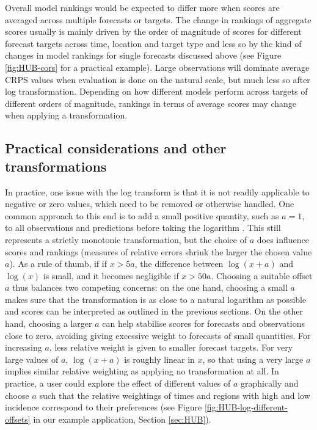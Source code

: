 \documentclass{article}
\begin{document}
Overall model rankings would be expected to differ more when scores are averaged across multiple forecasts or targets. The change in rankings of aggregate scores usually is mainly driven by the order of magnitude of scores for different forecast targets across time, location and target type and less so by the kind of changes in model rankings for single forecasts discussed above (see Figure \ref{fig:HUB-cors} for a practical example). Large observations will dominate average CRPS values when evaluation is done on the natural scale, but much less so after log transformation. Depending on how different models perform across targets of different orders of magnitude, rankings in terms of average scores may change when applying a transformation.


\subsection{Practical considerations and other transformations}
\label{sec:methods:considerations}

In practice, one issue with the log transform is that it is not readily applicable to negative or zero values, which need to be removed or otherwise handled. 
One common approach to this end is to add a small positive quantity, such as $a = 1$, to all observations and predictions before taking the logarithm \citep{bellegoDealingLogsZeros2022}. This still represents a strictly monotonic transformation, but the choice of $a$ does influence scores and rankings (measures of relative errors shrink the larger the chosen value $a$). As a rule of thumb, if if $x > 5a$, the difference between $\log{(x + a)}$ and $\log{(x)}$ is small, and it becomes negligible if $x > 50a$. Choosing a suitable offset $a$ thus balances two competing concerns: on the one hand, choosing a small $a$ makes sure that the transformation is as close to a natural logarithm as possible and scores can be interpreted as outlined in the previous sections. On the other hand, choosing a larger $a$ can help stabilise scores for forecasts and observations close to zero, avoiding giving excessive weight to forecasts of small quantities. For increasing $a$, less relative weight is given to smaller forecast targets. For very large values of $a$, $\log(x + a)$ is roughly linear in $x$, so that using a very large $a$ implies similar relative weighting as applying no transformation at all. In practice, a user could explore the effect of different values of $a$ graphically and choose $a$ such that the relative weightings of times and regions with high and low incidence correspond to their preferences (see Figure \ref{fig:HUB-log-different-offsets} in our example application, Section \ref{sec:HUB}).
\end{document}
